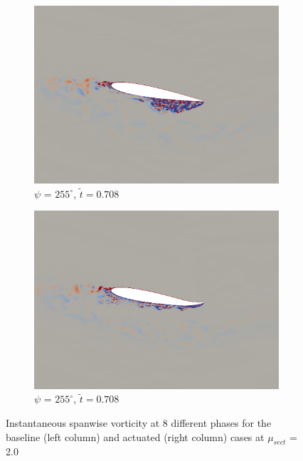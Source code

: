 \begin{figure}[H]
	\begin{subfigure}[b]{0.4\textwidth}
		\centering
		\includegraphics[width=1\textwidth]{figures/mu_2pt0/vorticity/baseline/phase_255.png}
		\caption{ $\psi$ = $255^\circ$, $\tilde{t}=0.708$}
		\label{fig:mu_2pt0_baseline_psi255}
	\end{subfigure}
	\begin{subfigure}[b]{0.4\textwidth}
		\centering
		\includegraphics[width=1\textwidth]{figures/mu_2pt0/vorticity/AC/phase_255.png}
		\caption{ $\psi$ = $255^\circ$, $\tilde{t}=0.708$}
		\label{fig:mu_2pt0_AC_psi255}
	\end{subfigure}
	
	
	\caption{Instantaneous spanwise vorticity at 8 different phases for the baseline (left column) and actuated (right column) cases at $\mu_{sect}$ = 2.0}
\end{figure}

